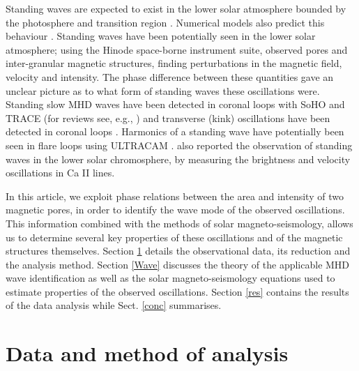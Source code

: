     Standing waves are expected to exist in the lower solar atmosphere bounded by the photosphere and transition region \citep{mein,leibacher}. Numerical models also predict this behaviour \citep{zhugzhda1,erdelyi,malins}.
    Standing waves have been potentially seen in the lower solar atmosphere; using the Hinode space-borne instrument suite, \citet{PMHDW} observed pores and inter-granular magnetic structures, finding perturbations in the magnetic field, velocity and intensity.
    The phase difference between these quantities gave an unclear picture as to what form of standing waves these oscillations were.
    Standing slow MHD waves have been detected in coronal loops with SoHO and TRACE (for reviews see, e.g., \citealp{wang2011standing,2012RSPTA.370.3193D}) and transverse (kink) oscillations have been detected in coronal loops \citep[e.g][for a review see \citealp{Andries2009,Ruderman2009}]{1999ApJ520880A,taroyan,oshea,2008ApJ...687L..45V}.
    Harmonics of a standing wave have potentially been seen in flare loops using ULTRACAM \citep[e.g.,][]{mathioudakis}.
    \citet{fleck} also reported the observation of standing waves in the lower solar chromosphere, by measuring the  brightness and velocity oscillations in Ca II lines. 
    
    In this article, we exploit phase relations between the area and intensity of two magnetic pores, in order to identify the wave mode of the observed oscillations.
    This information combined with the methods of solar magneto-seismology, allows us to determine several key properties of these oscillations and  of the magnetic structures themselves.
    Section \ref{DnA} details the observational data, its reduction and the analysis method.
    Section \ref{Wave} discusses the theory of the applicable MHD wave identification as well as the solar magneto-seismology equations used to estimate properties of the observed oscillations.
    Section \ref{res} contains the results of the data analysis while Sect. \ref{conc} summarises.  
    
\section{Data and method of analysis}
\label{DnA}

